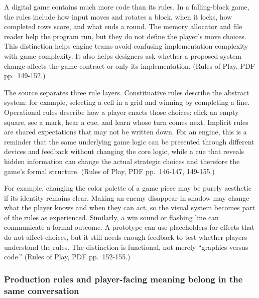 \hypertarget{05-engine-i-ch009-keep-the-rules-distinct-from-the-machinery}{}

A digital game contains much more code than its rules. In a falling-block game, the rules include how input moves and rotates a block, when it locks, how completed rows score, and what ends a round. The memory allocator and file reader help the program run, but they do not define the player's move choices. This distinction helps engine teams avoid confusing implementation complexity with game complexity. It also helps designers ask whether a proposed system change affects the game contract or only its implementation. (Rules of Play, PDF pp.~149-152.)

The source separates three rule layers. Constituative rules describe the abstract system: for example, selecting a cell in a grid and winning by completing a line. Operational rules describe how a player enacts those choices: click an empty square, see a mark, hear a cue, and learn whose turn comes next. Implicit rules are shared expectations that may not be written down. For an engine, this is a reminder that the same underlying game logic can be presented through different devices and feedback without changing the core logic, while a cue that reveals hidden information can change the actual strategic choices and therefore the game's formal structure. (Rules of Play, PDF pp.~146-147, 149-155.)

For example, changing the color palette of a game piece may be purely aesthetic if its identity remains clear. Making an enemy disappear in shadow may change what the player knows and when they can act, so the visual system becomes part of the rules as experienced. Similarly, a win sound or flashing line can communicate a formal outcome. A prototype can use placeholders for effects that do not affect choices, but it still needs enough feedback to test whether players understand the rules. The distinction is functional, not merely ``graphics versus code.'' (Rules of Play, PDF pp.~152-155.)

\subsubsection{Production rules and player-facing meaning belong in the same conversation}\label{05-engine-i-ch009-production-rules-and-player-facing-meaning-belong-in-the-same-conversation}

\hypertarget{05-engine-i-ch009-production-rules-and-player-facing-meaning-belong-in-the-same-conversation}{}

